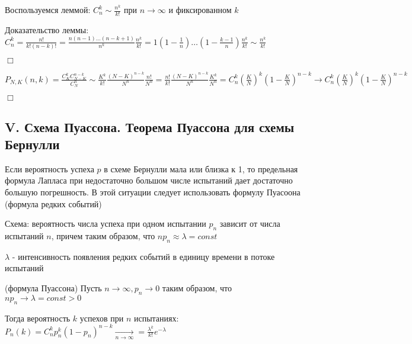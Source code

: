 \documentclass[12pt]{article}
\begin{document}
    Воспользуемся леммой: $C^k_n \sim \frac{n^k}{k!}$ при $n \to \infty$ и фиксированном $k$

    Доказательство леммы: $C_n^k = \frac{n!}{k!(n - k)!} = \frac{n(n - 1) \dots (n - k + 1)}{n^k} \frac{n^k}{k!} = 1 \left(1 - \frac{1}{n}\right) \dots \left(1 - \frac{k - 1}{n}\right) \frac{n^k}{k!} \sim \frac{n^k}{k!}$

    \begin{MyProof}
        $\Box$

        $P_{N,K} (n, k) = \frac{C^k_K C_{N - K}^{n - k}}{C^n_N} \sim \frac{K^k}{k!} \frac{(N - K)^{n - k}}{N^n} \frac{n!}{N^n} =
        \frac{n!}{k!} \frac{(N - K)^{n - k}}{N^n} \frac{K^k}{N^n} = C^k_n \left(\frac{K}{N}\right)^k \left(1 - \frac{K}{N}\right)^{n - k} \to C^k_n \left(\frac{K}{N}\right)^k \left(1 - \frac{K}{N}\right)^{n - k} $

        $\Box$
    \end{MyProof}

    \subsection{V. Схема Пуассона. Теорема Пуассона для схемы Бернулли}

    \Nota Если вероятность успеха $p$ в схеме Бернулли мала или близка к 1, то предельная формула Лапласа при недостаточно большом
    числе испытаний дает достаточно большую погрешность. В этой ситуации следует использовать формулу Пуасоона (формула редких событий)

    Схема: вероятность числа успеха при одном испытании $p_n$ зависит от числа испытаний $n$, причем таким образом, что $n p_n \approx \lambda = const$

    $\lambda$ - интенсивность появления редких событий в единицу времени в потоке испытаний

    \begin{MyTheorem}
         (формула Пуассона) Пусть $n \to \infty, p_n \to 0$ таким образом, что $n p_n \to \lambda = const > 0$

        Тогда вероятность $k$ успехов при $n$ испытаниях: $P_n(k) = C^k_n p_n^k (1 - p_n)^{n - k} \underset{n \to \infty}{\rightarrow} = \frac{\lambda^k}{k!} e^{-\lambda}$
    \end{MyTheorem}
\end{document}
